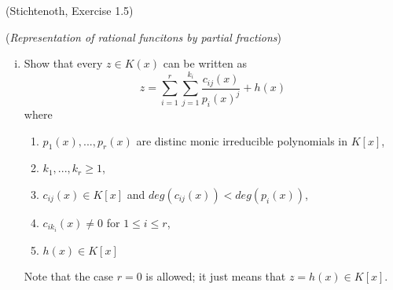 \begin{exercise}(Stichtenoth, Exercise 1.5) \label{PForPartial}
    
(\textit{Representation of rational funcitons by partial fractions})
    
\begin{enumerate}[(i)]
\item Show that every $z \in K(x)$ can be written as 
$$z = \sum^r_{i = 1} \sum^{k_i}_{j=1} \frac{c_{ij}(x)}{p_i(x)^j} + h(x)$$ where 

\begin{enumerate}
\item $p_1(x),...,p_r(x)$ are distinc monic irreducible polynomials in $K[x]$,
\item $k_1,...,k_r \geq 1$,
\item $c_{ij}(x) \in K[x]$ and $deg(c_{ij}(x)) < deg(p_i(x))$,
\item $c_{ik_i}(x) \neq 0$ for $1 \leq i \leq r$,
\item $h(x) \in K[x]$
\end{enumerate}

Note that the case $r = 0$ is allowed; it just means that $z = h(x) \in K[x]$.
    

\end{enumerate}
\end{exercise}

